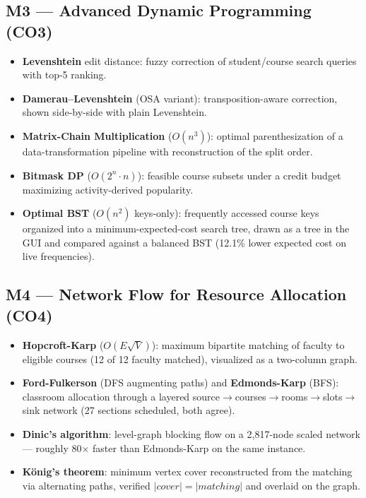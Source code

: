 \documentclass[11pt,a4paper]{article}
\begin{document}
\subsection{M3 --- Advanced Dynamic Programming (CO3)}
\begin{itemize}
    \item \textbf{Levenshtein} edit distance: fuzzy correction of student/course search
    queries with top-5 ranking.
    \item \textbf{Damerau--Levenshtein} (OSA variant): transposition-aware correction,
    shown side-by-side with plain Levenshtein.
    \item \textbf{Matrix-Chain Multiplication} ($O(n^3)$): optimal parenthesization of a
    data-transformation pipeline with reconstruction of the split order.
    \item \textbf{Bitmask DP} ($O(2^n \cdot n)$): feasible course subsets under a credit
    budget maximizing activity-derived popularity.
    \item \textbf{Optimal BST} ($O(n^2)$ keys-only): frequently accessed course keys
    organized into a minimum-expected-cost search tree, drawn as a tree in the GUI and
    compared against a balanced BST (12.1\% lower expected cost on live frequencies).
\end{itemize}

\subsection{M4 --- Network Flow for Resource Allocation (CO4)}
\begin{itemize}
    \item \textbf{Hopcroft-Karp} ($O(E\sqrt{V})$): maximum bipartite matching of faculty
    to eligible courses (12 of 12 faculty matched), visualized as a two-column graph.
    \item \textbf{Ford-Fulkerson} (DFS augmenting paths) and \textbf{Edmonds-Karp}
    (BFS): classroom allocation through a layered source$\to$courses$\to$rooms$\to$slots$\to$sink
    network (27 sections scheduled, both agree).
    \item \textbf{Dinic's algorithm}: level-graph blocking flow on a 2{,}817-node scaled
    network --- roughly 80$\times$ faster than Edmonds-Karp on the same instance.
    \item \textbf{K\"onig's theorem}: minimum vertex cover reconstructed from the
    matching via alternating paths, verified $|cover| = |matching|$ and overlaid on the
    graph.
\end{itemize}
\end{document}
